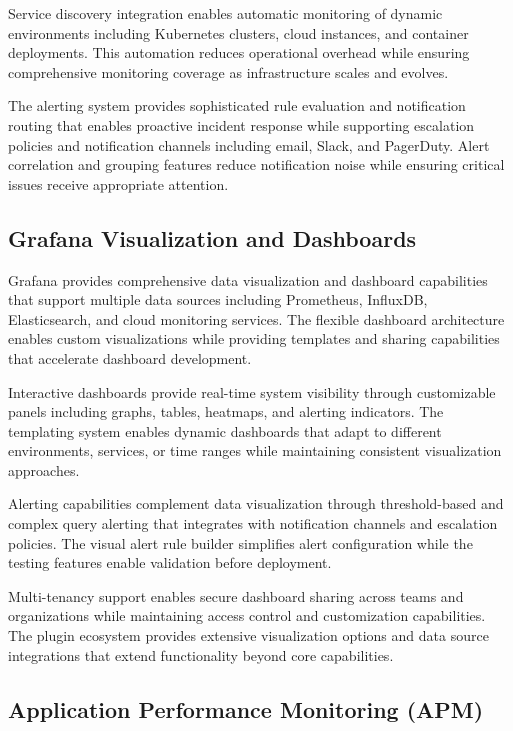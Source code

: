 Service discovery integration enables automatic monitoring of dynamic environments including Kubernetes clusters, cloud instances, and container deployments. This automation reduces operational overhead while ensuring comprehensive monitoring coverage as infrastructure scales and evolves.

The alerting system provides sophisticated rule evaluation and notification routing that enables proactive incident response while supporting escalation policies and notification channels including email, Slack, and PagerDuty. Alert correlation and grouping features reduce notification noise while ensuring critical issues receive appropriate attention.

\subsection{Grafana Visualization and Dashboards}

Grafana provides comprehensive data visualization and dashboard capabilities that support multiple data sources including Prometheus, InfluxDB, Elasticsearch, and cloud monitoring services. The flexible dashboard architecture enables custom visualizations while providing templates and sharing capabilities that accelerate dashboard development.

Interactive dashboards provide real-time system visibility through customizable panels including graphs, tables, heatmaps, and alerting indicators. The templating system enables dynamic dashboards that adapt to different environments, services, or time ranges while maintaining consistent visualization approaches.

Alerting capabilities complement data visualization through threshold-based and complex query alerting that integrates with notification channels and escalation policies. The visual alert rule builder simplifies alert configuration while the testing features enable validation before deployment.

Multi-tenancy support enables secure dashboard sharing across teams and organizations while maintaining access control and customization capabilities. The plugin ecosystem provides extensive visualization options and data source integrations that extend functionality beyond core capabilities.

\subsection{Application Performance Monitoring (APM)}

